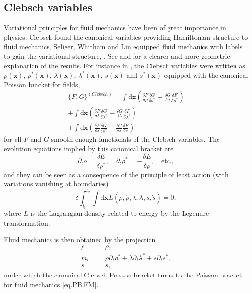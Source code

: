\documentclass[
10pt, %
a4paper, %
oneside, %
headinclude,footinclude, %
BCOR5mm, %
]{scrartcl}
\newcommand{\xx}{\mathbf{x}}
\newcommand{\dx}{\mathrm{d}\xx}
\newcommand{\MP}[1]{{\color{OliveGreen}MP:\ \ #1}}
\newcommand{\IP}[1]{{\color{Red}IP:\ \ #1}}
\newcommand{\Ffunc}{F}
\newcommand{\Gfunc}{G}
\begin{document}
\subsection{Clebsch variables}\label{sec.Clebsch}
Variational principles for fluid mechanics have been of great importance in physics. Clebsch 
\cite{Clebsch} found the canonical variables providing Hamiltonian structure to fluid mechanics, 
Seliger, Whitham \cite{Seliger-Whitham} and Lin \cite{Lin} equipped fluid mechanics with labels to 
gain the variational structure, \cite{Bedeaux-Clebsch}. See \cite{Cendra-Marsden} and 
\cite{Cotter2009} for a clearer and more geometric explanation of the results. For instance in 
\cite{PKG}, the Clebsch variables were written as $\rho(\xx)$, $\rho^*(\xx)$, $\lambda(\xx)$, 
$\lambda^*(\xx)$, $s(\xx)$ and $s^*(\xx)$ equipped with the canonical Poisson bracket for fields,
\begin{multline}
    \{\Ffunc,\Gfunc\}^{(Clebsch)} = \int\dx \left(\frac{\delta \Ffunc}{\delta 
    \rho}\frac{\delta \Gfunc}{\delta \rho^*}-\frac{\delta \Gfunc}{\delta 
    \rho}\frac{\delta \Ffunc}{\delta \rho^*}\right)\\
    + \int\dx \left(\frac{\delta \Ffunc}{\delta \lambda}\frac{\delta 
    \Gfunc}{\delta 
    \lambda^*}-\frac{\delta \Gfunc}{\delta \lambda}\frac{\delta \Ffunc}{\delta 
    \lambda^*}\right)\\
    + \int\dx \left(\frac{\delta \Ffunc}{\delta s}\frac{\delta \Gfunc}{\delta 
    s^*}-\frac{\delta \Gfunc}{\delta s}\frac{\delta \Ffunc}{\delta s}\right)
\end{multline}
for all $\Ffunc$ and $\Gfunc$ smooth enough functionals of the Clebsch variables. The evolution 
equations implied by this canonical bracket are
\begin{equation}
    \partial_t \rho = \frac{\delta E}{\delta \rho^*}, \quad \partial_t \rho^* = - \frac{\delta 
    E}{\delta \rho}, \quad \mathrm{etc.},
\end{equation}
and they can be seen as a consequence of the principle of least action (with variations vanishing at boundaries)
\begin{equation}
    \delta \int_{t_1}^{t_2} \int\dx L(\rho,\dot{\rho}, \lambda, \dot{\lambda}, s, \dot{s}) = 0,
\end{equation}
where $L$ is the Lagrangian density related to energy by the Legendre transformation.

Fluid mechanics is then obtained by the projection
\begin{subequations}
\begin{eqnarray}
    \rho &=& \rho,\\
    m_i &=& \rho\partial_i \rho^* + \lambda \partial_i \lambda^* + s \partial_i s^*,\\
    s &=& s,
\end{eqnarray}
\end{subequations}
under which the canonical Clebsch Poisson bracket turns to the Poisson bracket for fluid mechanics 
\eqref{eq.PB.FM}.
\end{document}

